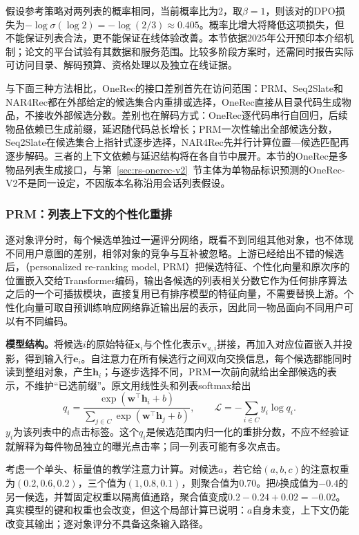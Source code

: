 假设参考策略对两列表的概率相同，当前概率比为2，取$\beta=1$，则该对的DPO损失为$-\log\sigma(\log2)=-\log(2/3)\approx0.405$。概率比增大将降低这项损失，但不能保证列表合法，更不能保证在线体验改善。本节依据2025年公开预印本介绍机制；论文的平台试验有其数据和服务范围。比较多阶段方案时，还需同时报告实际可访问目录、解码预算、资格处理以及独立在线证据。

与下面三种方法相比，OneRec的接口差别首先在访问范围：PRM、Seq2Slate和NAR4Rec都在外部给定的候选集合内重排或选择，OneRec直接从目录代码生成物品，不接收外部候选分数。差别也在解码方式：OneRec逐代码串行自回归，后续物品依赖已生成前缀，延迟随代码总长增长；PRM一次性输出全部候选分数，Seq2Slate在候选集合上指针式逐步选择，NAR4Rec先并行计算位置—候选匹配再逐步解码。三者的上下文依赖与延迟结构将在各自节中展开。本节的OneRec是多物品列表生成接口，与第~\ref{sec:rs-onerec-v2}~节主体为单物品标识预测的OneRec-V2不是同一设定，不因版本名称沿用会话列表假设。

\subsubsection{PRM：列表上下文的个性化重排}
\label{sec:rs-prm}

逐对象评分时，每个候选单独过一遍评分网络，既看不到同组其他对象，也不体现不同用户意图的差别，相邻对象的竞争与互补被忽略。上游已经给出不错的候选后，（personalized re-ranking model, PRM）把候选特征、个性化向量和原次序的位置嵌入交给Transformer编码，输出各候选的列表相关分数它作为任何排序算法之后的一个可插拔模块，直接复用已有排序模型的特征向量，不需要替换上游。个性化向量可取自预训练响应网络靠近输出层的表示，因此同一物品面向不同用户可以有不同编码。

\textbf{模型结构。}将候选$i$的原始特征$\bm x_i$与个性化表示$\bm v_{u,i}$拼接，再加入对应位置嵌入并投影，得到输入行$\bm e_i$。自注意力在所有候选行之间双向交换信息，每个候选都能同时读到整组对象，产生$\bm h_i$；与逐步选择不同，PRM一次前向就给出全部候选的表示，不维护“已选前缀”。原文用线性头和列表softmax给出
\[
 q_i=\frac{\exp(\bm w^\top\bm h_i+b)}
 {\sum_{j\in C}\exp(\bm w^\top\bm h_j+b)},
 \qquad
 \mathcal L=-\sum_{i\in C}y_i\log q_i.
\]
$y_i$为该列表中的点击标签。这个$q_i$是候选范围内归一化的重排分数，不应不经验证就解释为每件物品独立的曝光点击率；同一列表可能有多次点击。

考虑一个单头、标量值的教学注意力计算。对候选$a$，若它给$(a,b,c)$的注意权重为$(0.2,0.6,0.2)$，三个值为$(1,0.8,0.1)$，则聚合值为0.70。把$b$换成值为$-0.4$的另一候选，并暂固定权重以隔离值通路，聚合值变成$0.2-0.24+0.02=-0.02$。真实模型的键和权重也会改变，但这个局部计算已说明：$a$自身未变，上下文仍能改变其输出；逐对象评分不具备这条输入路径。


